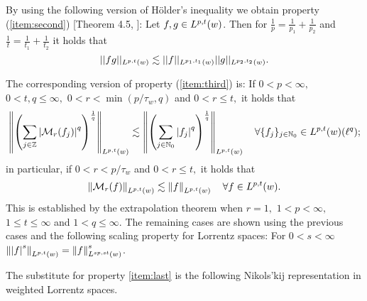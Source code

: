 By using the following version of H\"older's inequality we obtain property (\ref{item:second}) [Theorem 4.5, \cite{MR0223874}]: Let $f,g\in L^{p,t}(w)$. Then for $\frac{1}{p} = \frac{1}{p_1} + \frac{1}{p_2}$ and $\frac{1}{t} = \frac{1}{t_1} + \frac{1}{t_2}$ it holds that \[||fg||_{L^{p,t}(w)} \lesssim ||f||_{L^{p_1,t_1}(w)}||g||_{L^{p_2,t_2}(w)} .\]

The corresponding version of property (\ref{item:third}) is: 
 If $0<p<\infty,$  $0<t,q\le\infty,$  $0<r<\min(p/\tau_w,q)$ and $0<r\le t,$ it holds that
\begin{equation}\label{eq:FTLorentz}
\left\|\left(\sum_{j\in\mathbb{Z}} \left\vert \mathcal{M}_r(f_j) \right\vert^q\right)^{\frac{1}{q}}\right\|_{L^{p,t}(w)}\lesssim \left\|\left(\sum_{j\in\mathbb{N}_0} \left\vert f_j \right\vert^q\right)^{\frac{1}{q}}\right\|_{L^{p,t}(w)}\quad \forall \{f_j\}_{j\in \mathbb{N}_0}\in L^{p,t}(w)(\ell^q);  
\end{equation}
in particular, if $0<r<p/\tau_w$ and $0<r\le t,$ it holds that 
\begin{equation*}
\left\|\mathcal{M}_r(f)\right\|_{L^{p,t}(w)}\lesssim \left\|f\right\|_{L^{p,t}(w)}\quad \forall f\in L^{p,t}(w). 
\end{equation*}
This is established by the extrapolation theorem \cite[Theorem 4.10 and comments on page 70]{MR2797562} when $r=1,$ $1<p<\infty,$  $1\le t\le \infty$ and $1<q\le \infty.$ The remaining cases are shown using the previous cases and the following scaling property for Lorrentz spaces: For $0<s<\infty$ $\left\|\left\vert f \right\vert^s\right\|_{L^{p,t}(w)}=\left\|f\right\|_{L^{sp,st}(w)}^s$.

The substitute for property \ref{item:last} is the following Nikols'kij representation in weighted Lorrentz spaces.

